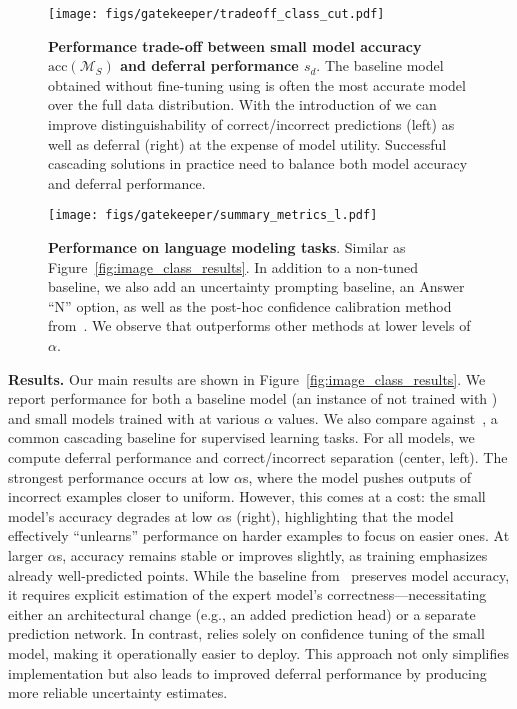 \begin{figure}[t]
    \centering
    \texttt{[image: figs/gatekeeper/tradeoff\_class\_cut.pdf]}
    \caption[Performance trade-off between small model accuracy $\text{acc}(\mathcal{M}_S)$ and deferral performance $s_d$.]{\textbf{Performance trade-off between small model accuracy $\text{acc}(\mathcal{M}_S)$ and deferral performance $s_d$}. The baseline model obtained without fine-tuning using \loss is often the most accurate model over the full data distribution. With the introduction of \loss we can improve distinguishability of correct/incorrect predictions (left) as well as deferral (right) at the expense of model utility. Successful cascading solutions in practice need to balance both model accuracy and deferral performance.}
    \label{fig:tradeoffs}
\end{figure}

\begin{figure*}[t]
    \centering
    \texttt{[image: figs/gatekeeper/summary\_metrics\_l.pdf]}
    \caption[Performance on language modeling tasks.]{\textbf{Performance on language modeling tasks}. Similar as Figure~\ref{fig:image_class_results}. In addition to a non-tuned baseline, we also add an uncertainty prompting baseline, an Answer ``N'' option, as well as the post-hoc confidence calibration method from~\citet{gupta2024languagemodelcascadestokenlevel}. We observe that \loss outperforms other methods at lower levels of $\alpha$.}
    \label{fig:l_results}
\end{figure*}

\textbf{Results.} Our main results are shown in Figure~\ref{fig:image_class_results}. We report performance for both a baseline model (an instance of \smallmodel not trained with \loss) and small models trained with \loss at various $\alpha$ values. We also compare against~\citet{NEURIPS2022_bc8f76d9}, a common cascading baseline for supervised learning tasks. For all models, we compute deferral performance and correct/incorrect separation (center, left). The strongest performance occurs at low $\alpha$s, where the model pushes outputs of incorrect examples closer to uniform. However, this comes at a cost: the small model’s accuracy degrades at low $\alpha$s (right), highlighting that the model effectively “unlearns” performance on harder examples to focus on easier ones. At larger $\alpha$s, accuracy remains stable or improves slightly, as training emphasizes already well-predicted points. While the baseline from~\citet{NEURIPS2022_bc8f76d9} preserves model accuracy, it requires explicit estimation of the expert model’s correctness—necessitating either an architectural change (e.g., an added prediction head) or a separate prediction network. In contrast, \loss relies solely on confidence tuning of the small model, making it operationally easier to deploy. This approach not only simplifies implementation but also leads to improved deferral performance by producing more reliable uncertainty estimates.

